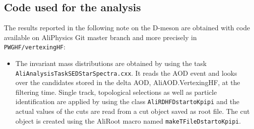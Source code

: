 \subsection{Code used for the analysis}
The results reported in the following note on the D-meson \raa are obtained with code available on AliPhysics Git master branch and more precisely in \texttt{PWGHF/vertexingHF}:
\begin{itemize}
	\item The \Dstar invariant mass distributions are obtained by using the task \texttt{AliAnalysisTaskSEDStarSpectra.cxx}. It reads the AOD event and looks over the \Dstar candidates stored in the delta AOD, AliAOD.VertexingHF, at the filtering time. Single track, topological selections as well as particle identification are applied by using the class  \texttt{AliRDHFDstartoKpipi} and the actual values of the cuts are read from a cut object saved as root file. The cut object is created using the AliRoot macro named \texttt{makeTFileDstartoKpipi}.
\end{itemize}


